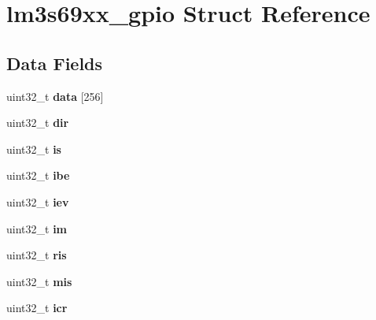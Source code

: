 \hypertarget{structlm3s69xx__gpio}{}\section{lm3s69xx\+\_\+gpio Struct Reference}
\label{structlm3s69xx__gpio}
\subsection*{Data Fields}
\begin{DoxyCompactItemize}
\item 
\mbox{\label{structlm3s69xx__gpio_a4509454d7c34ecb1638251d62526abc1}} 
uint32\+\_\+t {\bfseries data} \mbox{[}256\mbox{]}
\item 
\mbox{\label{structlm3s69xx__gpio_a190d19db89d0ebbeb20a3a0c7dd2dd2f}} 
uint32\+\_\+t {\bfseries dir}
\item 
\mbox{\label{structlm3s69xx__gpio_a40115c696594eddc4e11a256b47336a6}} 
uint32\+\_\+t {\bfseries is}
\item 
\mbox{\label{structlm3s69xx__gpio_aefbb374b1ad577812e27c99a51b7db79}} 
uint32\+\_\+t {\bfseries ibe}
\item 
\mbox{\label{structlm3s69xx__gpio_a653edc3574aef7cdbad0a11f5b909516}} 
uint32\+\_\+t {\bfseries iev}
\item 
\mbox{\label{structlm3s69xx__gpio_a6da73ef7477856cdada70f4da3428c58}} 
uint32\+\_\+t {\bfseries im}
\item 
\mbox{\label{structlm3s69xx__gpio_a37bb0f4eefdbeefa2d5acb886fcf316d}} 
uint32\+\_\+t {\bfseries ris}
\item 
\mbox{\label{structlm3s69xx__gpio_aca81d261766074eca711ed6cb7315b3c}} 
uint32\+\_\+t {\bfseries mis}
\item 
\mbox{\label{structlm3s69xx__gpio_afe7ed1995dae7457773acd230e302066}} 
uint32\+\_\+t {\bfseries icr}
\item 
\mbox{\label{structlm3s69xx__gpio_a61d51fbcf366d96060dc54525ccd0db1}} 

\end{DoxyCompactItemize}
